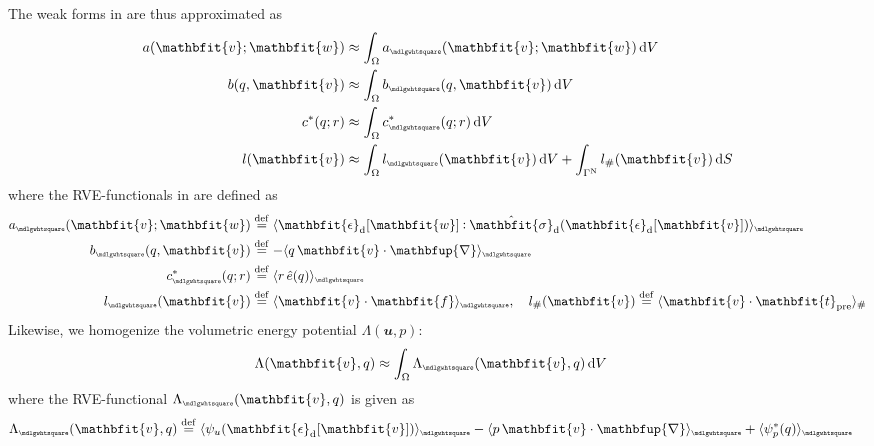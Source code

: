 \documentclass[12pt,a4paper]{article}
\renewcommand{\ta}[1]{\mathbfit{#1}}
\renewcommand{\ts}[1]{\mathbfit{#1}}
\renewcommand{\diff}{\mathbfup{\nabla}}
\renewcommand{\Box}{\mdlgwhtsquare}
\DeclarePairedDelimiter{\homgen}{\langle}{\rangle_\rve}
\newcommand{\prescribed}{\mathrm{pre}}
\renewcommand{\dev}{\mathrm{d}}
\newcommand{\rve}{
  {\mathchoice
   {\mbox{\scalebox{0.67}{$\Box$}}}
   {\mbox{\scalebox{0.67}{$\Box$}}}
   {\mbox{\scalebox{0.5}{$\Box$}}}
   {\mbox{\scalebox{0.375}{$\Box$}}}
  }
}
\begin{document}
The weak forms in  are thus approximated as
\begin{align}
    a(\ta{v};\ta{w}) &\approx \int_\Omega a_\rve(\ta{v};\ta{w}) \dif V
\label{eq7a} \\
    b(q,\ta{v}) &\approx \int_\Omega b_\rve(q,\ta{v}) \dif V
\label{eq7b} \\
    c^*(q;r) &\approx \int_\Omega c^*_\rve(q;r) \dif V
\label{eq7c} \\
    l(\ta{v}) &\approx \int_\Omega l_\rve(\ta{v}) \dif V + \int_{\Gamma^\Neumann} l_\#(\ta{v}) \dif S
\label{eq7d}
\end{align}
where the RVE-functionals in  are defined as
\begin{align}
    a_\rve(\ta{v};\ta{w}) &\defeq
    \homgen{ \ts{\epsilon}_\dev[\ta{w}]\dprod \hat{\ts{\sigma}}_\dev(\ts{\epsilon}_\dev[\ta{v}]) }
\label{eq8a} \\
    b_\rve(q,\ta{v}) &\defeq
    -  \homgen{ q\,\ta{v}\cdot\diff }
\label{eq8b} \\
    c^*_\rve(q;r) &\defeq
    \homgen{ r\,\hat{e}(q) }
\label{eq8c} \\
    l_\rve(\ta{v}) &\defeq
    \homgen{ \ta{v}\cdot\ta{f} }, \quad
    l_\#(\ta{v}) \defeq
    \langle \ta{v}\cdot \ta t_\prescribed \rangle_\#
\label{eq8d}
\end{align}
Likewise, we homogenize the volumetric energy potential $\Lambda(\ta{u},p)$:
\begin{align}
    \Lambda(\ta{v},q) &\approx \int_\Omega \Lambda_\rve(\ta{v},q) \dif V
\label{eq222}
\end{align}
where the RVE-functional $\Lambda_\rve(\ta{v},q)$ is given as
\begin{align}
    \Lambda_\rve(\ta{v},q) &\defeq
    \homgen{ \psi_u(\ts{\epsilon}_\dev[\ta{v}])} -
    \homgen{  p\,\ta{v}\cdot\diff } + \homgen{ \psi_p^*(q) }
\label{eqRveBulkPotential}
\end{align}
\end{document}
